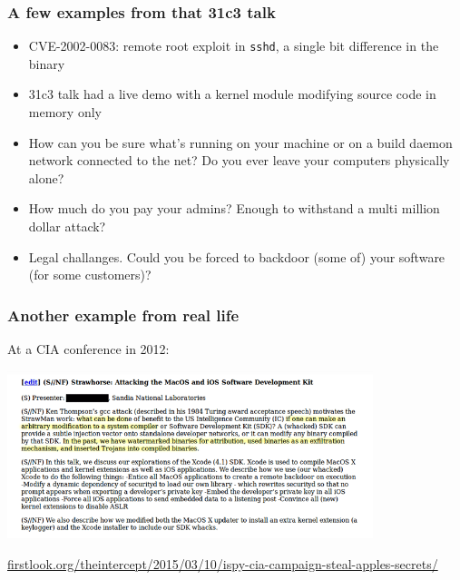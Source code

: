 \documentclass[14pt,aspectratio=169]{beamer}
\newif\ifplacelogo
\begin{document}
\begin{frame}[fragile]
 \frametitle{A few examples from that 31c3 talk}
 \begin{itemize}
  \item CVE-2002-0083: remote root exploit in \texttt{sshd}, a single bit difference in the binary
  \item<2-5> 31c3 talk had a live demo with a kernel module modifying source code in memory only
  \item<3-5> How can you be sure what's running on your machine or on a build
  daemon network connected to the net? Do you ever leave your computers
  physically alone? 
  \item<4-5> How much do you pay your admins? Enough to withstand a multi million
  dollar attack?
  \item<5> Legal challanges. Could you be forced to backdoor (some of) your
  software (for some customers)?
 \end{itemize}
\end{frame}

\begin{frame}[fragile]
 \frametitle{Another example from real life}

 At a CIA conference in 2012:
 \begin{center}
  \includegraphics[width=0.8\textwidth]{images/strawhorse.png}

  {\footnotesize
  \url{firstlook.org/theintercept/2015/03/10/ispy-cia-campaign-steal-apples-secrets/}
  }
 \end{center}
\end{frame}



\placelogotrue
\end{document}
